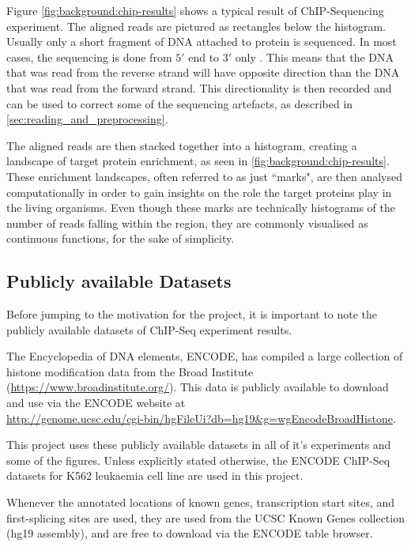 \documentclass[parskip]{cs4rep}
\begin{document}
Figure \ref{fig:background:chip-results} shows a typical result of ChIP-Sequencing experiment.
The aligned reads are pictured as rectangles below the histogram. Usually only a short fragment of DNA attached to protein is sequenced. In most cases, the sequencing is done from $5'$ end to $3'$ only \cite{Park:2009wc}. This means that the DNA that was read from the reverse strand will have opposite direction than the DNA that was read from the forward strand. This directionality is then recorded and can be used to correct some of the sequencing artefacts, as described in \autoref{sec:reading_and_preprocessing}.

The aligned reads are then stacked together into a histogram, creating a landscape of target protein enrichment, as seen in \autoref{fig:background:chip-results}. These enrichment landscapes, often referred to as just ``marks", are then analysed computationally in order to gain insights on the role the target proteins play in the living organisms. Even though these marks are technically histograms of the number of reads falling within the region, they are commonly visualised as continuous functions, for the sake of simplicity.

\subsection{Publicly available Datasets}
\label{sec:datasets}

Before jumping to the motivation for the project, it is important to note the publicly available datasets of ChIP-Seq experiment results.

The Encyclopedia of DNA elements, ENCODE, \cite{TheENCODEProjectConsortium:2004db} has compiled a large collection of histone modification data from the Broad Institute (\url{https://www.broadinstitute.org/}). This data is publicly available to download and use via the ENCODE website at\\
\url{http://genome.ucsc.edu/cgi-bin/hgFileUi?db=hg19&g=wgEncodeBroadHistone}. 

This project uses these publicly available datasets in all of it's experiments and some of the figures. Unless explicitly stated otherwise, the ENCODE ChIP-Seq datasets for K562 leukaemia cell line are used in this project.

Whenever the annotated locations of known genes, transcription start sites, and first-splicing sites are used, they are used from the UCSC Known Genes collection \cite{Hsu:2006dh} (hg19 assembly), and are free to download via the ENCODE table browser. 
\end{document}
